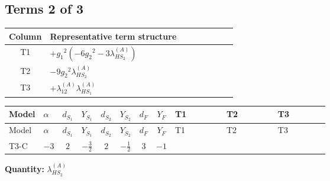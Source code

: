 \documentclass[8pt]{article}
\begin{document}
\begin{landscape}
\subsection*{Terms 2 of 3}
\begin{center}
\begin{tabular}{@{}c >{\raggedright\arraybackslash}p{0.82\linewidth}@{}}
\toprule
Column & Representative term structure \\
\midrule
T1 & \(\displaystyle +{g_1}^2 \left(-6 {g_2}^2-3 {\lambda_{HS_2}^{(A)}}\right)\) \\
\midrule
T2 & \(\displaystyle -9 {g_2}^2 {\lambda_{HS_2}^{(A)}}\) \\
\midrule
T3 & \(\displaystyle +{\lambda_{12}^{(A)}} {\lambda_{HS_1}^{(A)}}\) \\
\midrule
\bottomrule
\end{tabular}
\end{center}
\smallskip
\tiny
\begin{longtable}{@{}llcccccc >{\raggedright\arraybackslash}p{0.21\linewidth} >{\raggedright\arraybackslash}p{0.21\linewidth} >{\raggedright\arraybackslash}p{0.21\linewidth}@{}}
\toprule
Model & $\alpha$ & $d_{S_1}$ & $Y_{S_1}$ & $d_{S_2}$ & $Y_{S_2}$ & $d_F$ & $Y_F$ & T1 & T2 & T3 \\
\midrule
\endfirsthead
\toprule
Model & $\alpha$ & $d_{S_1}$ & $Y_{S_1}$ & $d_{S_2}$ & $Y_{S_2}$ & $d_F$ & $Y_F$ & T1 & T2 & T3 \\
\midrule
\endhead
T3-C & $-3$ & $2$ & $-\frac{3}{2}$ & $2$ & $-\frac{1}{2}$ & $3$ & $-1$ & \scriptsize\adjustbox{max width=\linewidth}{$\begin{gathered} +{g_1}^2 \left(-6 {g_2}^2-3 {\lambda_{HS_2}^{(A)}}\right)\end{gathered}$} & \scriptsize\adjustbox{max width=\linewidth}{$\begin{gathered} -9 {g_2}^2 {\lambda_{HS_2}^{(A)}}\end{gathered}$} & \scriptsize\adjustbox{max width=\linewidth}{$\begin{gathered} +{\lambda_{12}^{(A)}} {\lambda_{HS_1}^{(A)}}\end{gathered}$} \\
\midrule
\bottomrule
\end{longtable}
\clearpage
\noindent\textbf{Quantity: }$\lambda_{HS_2}^{(A)}$\par\smallskip

\end{landscape}
\end{document}
